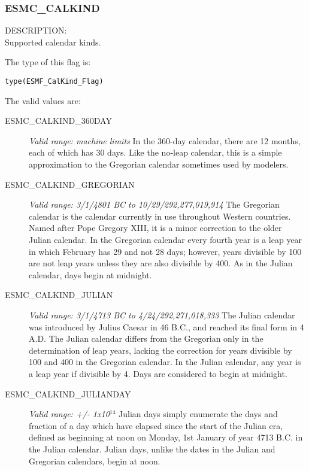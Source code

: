 
\label{subsec:Calendar_options}

\subsubsection{ESMC\_CALKIND}
\label{const:calkindflag_c}


{\sf DESCRIPTION:\\}
Supported calendar kinds.

The type of this flag is:

{\tt type(ESMF\_CalKind\_Flag)}

The valid values are:
\begin{description}
      
\item [ESMC\_CALKIND\_360DAY] 
{\it Valid range: machine limits} 
\newline In the 360-day calendar, there are 12 months, each of which has 30 days.  
Like the no-leap calendar, this is a simple approximation to the Gregorian
calendar sometimes used by modelers.

\item [ESMC\_CALKIND\_GREGORIAN] 
{\it Valid range: 3/1/4801 BC to 10/29/292,277,019,914 }
\newline The Gregorian calendar is the calendar currently in use 
throughout Western countries.  Named after Pope Gregory XIII, it is a minor 
correction to the older Julian calendar. In the Gregorian calendar every
fourth year is a leap year in which February has 29 and not 28 days;
however, years divisible by 100 are not leap years unless they are also 
divisible  by 400.  As in the Julian calendar, days begin at midnight.

\item [ESMC\_CALKIND\_JULIAN]
{\it Valid range: 3/1/4713 BC to 4/24/292,271,018,333 } 
\newline The Julian calendar was introduced by Julius Caesar in 46 B.C., and 
reached its final form in 4 A.D.  The Julian calendar differs from the 
Gregorian only in the determination of leap years, lacking the correction 
for years divisible by 100 and 400 in the Gregorian calendar.  In the Julian 
calendar, any year is a leap year if divisible by 4.  Days are considered to 
begin at midnight.

\item [ESMC\_CALKIND\_JULIANDAY] 
{\it Valid range:  +/- 1x10$^{14}$} 
\newline Julian days simply enumerate the days and fraction of a day which 
have elapsed since the start of the Julian era, defined as beginning at noon 
on Monday, 1st January of year 4713 B.C. in the Julian calendar.  Julian days, 
unlike the dates in the Julian and Gregorian calendars, begin at noon.


\end{description}
